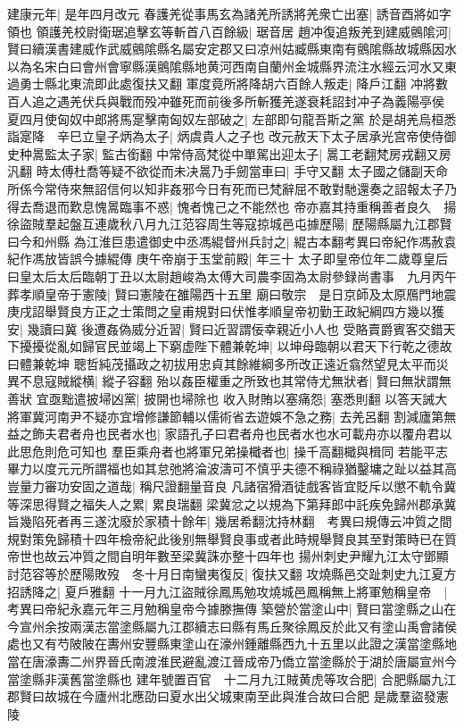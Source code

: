 建康元年|{
	是年四月改元}
春護羌從事馬玄為諸羌所誘將羌衆亡出塞|{
	誘音酉將如字領也}
領護羌校尉衛琚追擊玄等斬首八百餘級|{
	琚音居}
趙冲復追叛羌到建威鸇隂河|{
	賢曰續漢書建威作武威鸇隂縣名屬安定郡又曰凉州姑臧縣東南有鸇隂縣故城縣因水以為名宋白曰會州會寧縣漢鸇隂縣地黄河西南自蘭州金城縣界流注水經云河水又東過勇士縣北東流即此處復扶又翻}
軍度竟所將降胡六百餘人叛走|{
	降戶江翻}
冲將數百人追之遇羌伏兵與戰而殁冲雖死而前後多所斬獲羌遂衰耗詔封冲子為義陽亭侯　夏四月使匈奴中郎將馬寔擊南匈奴左部破之|{
	左部即句龍吾斯之黨}
於是胡羌烏桓悉詣寔降　辛巳立皇子炳為太子|{
	炳虞貴人之子也}
改元赦天下太子居承光宫帝使侍御史种暠監太子家|{
	監古銜翻}
中常侍高梵從中單駕出迎太子|{
	暠工老翻梵房戎翻又房汎翻}
時太傅杜喬等疑不欲從而未决暠乃手劒當車曰|{
	手守又翻}
太子國之儲副天命所係今常侍來無詔信何以知非姦邪今日有死而已梵辭屈不敢對馳還奏之詔報太子乃得去喬退而歎息愧暠臨事不惑|{
	愧者愧己之不能然也}
帝亦嘉其持重稱善者良久　揚徐盜賊羣起盤互連歲秋八月九江范容周生等寇掠城邑屯據歷陽|{
	歷陽縣屬九江郡賢曰今和州縣}
為江淮巨患遣御史中丞馮緄督州兵討之|{
	緄古本翻考異曰帝紀作馮赦袁紀作馮放皆誤今據緄傳}
庚午帝崩于玉堂前殿|{
	年三十}
太子即皇帝位年二歲尊皇后曰皇太后太后臨朝丁丑以太尉趙峻為太傅大司農李固為太尉參録尚書事　九月丙午葬孝順皇帝于憲陵|{
	賢曰憲陵在雒陽西十五里}
廟曰敬宗　是日京師及太原鴈門地震　庚戌詔舉賢良方正之士策問之皇甫規對曰伏惟孝順皇帝初勤王政紀綱四方幾以獲安|{
	幾讀曰冀}
後遭姦偽威分近習|{
	賢曰近習謂佞幸親近小人也}
受賂賣爵賓客交錯天下擾擾從亂如歸官民並竭上下窮虚陛下體兼乾坤|{
	以坤母臨朝以君天下行乾之德故曰體兼乾坤}
聰哲純茂攝政之初拔用忠貞其餘維綱多所改正遠近翕然望見太平而災異不息寇賊縱横|{
	縱子容翻}
殆以姦臣權重之所致也其常侍尤無狀者|{
	賢曰無狀謂無善狀}
宜亟黜遣披埽凶黨|{
	披開也埽除也}
收入財賄以塞痛怨|{
	塞悉則翻}
以答天誡大將軍冀河南尹不疑亦宜增修謙節輔以儒術省去遊娛不急之務|{
	去羌呂翻}
割減廬第無益之飾夫君者舟也民者水也|{
	家語孔子曰君者舟也民者水也水可載舟亦以覆舟君以此思危則危可知也}
羣臣乘舟者也將軍兄弟操檝者也|{
	操千高翻檝與楫同}
若能平志畢力以度元元所謂福也如其怠弛將淪波濤可不慎乎夫德不稱祿猶鑿墉之趾以益其高豈量力審功安固之道哉|{
	稱尺證翻量音良}
凡諸宿猾酒徒戲客皆宜貶斥以懲不軌令冀等深思得賢之福失人之累|{
	累良瑞翻}
梁冀忿之以規為下第拜郎中託疾免歸州郡承冀旨幾陷死者再三遂沈廢於家積十餘年|{
	幾居希翻沈持林翻　考異曰規傳云冲質之間規對策免歸積十四年檢帝紀此後别無舉賢良事或者此時規舉賢良其至對策時已在質帝世也故云冲質之間自明年數至梁冀誅亦整十四年也}
揚州刺史尹耀九江太守鄧顯討范容等於歷陽敗歿　冬十月日南蠻夷復反|{
	復扶又翻}
攻燒縣邑交趾刺史九江夏方招誘降之|{
	夏戶雅翻}
十一月九江盜賊徐鳳馬勉攻燒城邑鳳稱無上將軍勉稱皇帝　|{
	考異曰帝紀永嘉元年三月勉稱皇帝今據滕撫傳}
築營於當塗山中|{
	賢曰當塗縣之山在今宣州余按兩漢志當塗縣屬九江郡續志曰縣有馬丘聚徐鳳反於此又有塗山禹會諸侯處也又有芍陂陂在夀州安豐縣東塗山在濠州鍾離縣西九十五里以此證之漢當塗縣地當在唐濠夀二州界晉氏南渡淮民避亂渡江晉成帝乃僑立當塗縣於于湖於唐屬宣州今當塗縣非漢舊當塗縣也}
建年號置百官　十二月九江賊黄虎等攻合肥|{
	合肥縣屬九江郡賢曰故城在今廬州北應劭曰夏水出父城東南至此與淮合故曰合肥}
是歲羣盜發憲陵

